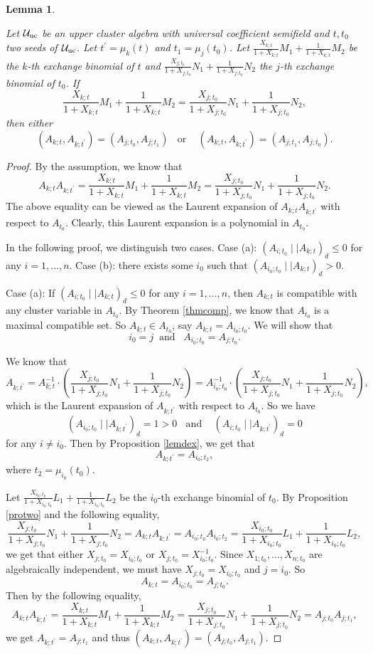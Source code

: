 \documentclass{amsart}
\newtheorem{lemma}[theorem]{Lemma}
\theoremstyle{definition}
\theoremstyle{remark}
\numberwithin{equation}{section}
\begin{document}
\begin{lemma} \label{lemb}

Let $\mathcal U_{\rm uc}$ be an upper cluster algebra with universal coefficient semifield and $t, t_0$ two seeds of  $\mathcal U_{\rm uc}$. Let $t^\prime=\mu_k(t)$ and $t_1=\mu_j(t_0)$. Let $\frac{X_{k;t}}{1+X_{k;t}}M_1+\frac{1}{1+X_{k;t}}M_2$ be the $k$-th exchange binomial of $t$ and $\frac{X_{j;t_0}}{1+X_{j;t_0}}N_1+\frac{1}{1+X_{j;t_0}}N_2$  the $j$-th exchange binomial of $t_0$.
If $$\frac{X_{k;t}}{1+X_{k;t}}M_1+\frac{1}{1+X_{k;t}}M_2=\frac{X_{j;t_0}}{1+X_{j;t_0}}N_1+\frac{1}{1+X_{j;t_0}}N_2,$$
then either $$(A_{k;t},A_{k;t^\prime})=(A_{j;t_0},A_{j;t_1})\;\;\text{ or }\;\;\;(A_{k;t},A_{k;t^\prime})=(A_{j;t_1},A_{j;t_0}).$$
\end{lemma}
\begin{proof}
By the assumption, we know that $$A_{k;t}A_{k;t^\prime}=\frac{X_{k;t}}{1+X_{k;t}}M_1+\frac{1}{1+X_{k;t}}M_2=\frac{X_{j;t_0}}{1+X_{j;t_0}}N_1+\frac{1}{1+X_{j;t_0}}N_2.$$
The above equality can be viewed as the Laurent expansion of $A_{k;t}A_{k;t^\prime}$ with respect to $A_{t_0}$. Clearly, this Laurent expansion is a polynomial in $A_{t_0}$.

In the following proof, we distinguish two cases. Case (a): $(A_{i;t_0}\mid\mid  A_{k;t})_d\leq 0$ for any $i=1,\ldots,n$. Case (b): there exists some $i_0$ such that $(A_{i_0;t_0}\mid\mid  A_{k;t})_d>0$.

Case (a): If $(A_{i;t_0}\mid\mid  A_{k;t})_d\leq 0$ for any $i=1,\ldots,n$, then $A_{k;t}$ is compatible with any cluster variable in $A_{t_0}$. By Theorem \ref{thmcomp}, we know that $A_{t_0}$ is a maximal compatible set. So $A_{k;t}\in A_{t_0}$, say $A_{k;t}=A_{i_0;t_0}$. We will show that $$i_0=j\;\;\text{and}\;\;\;A_{i_0;t_0}=A_{j;t_0}.$$

 We know that
 $$A_{k;t^\prime}=A_{k;t}^{-1}\cdot(\frac{X_{j;t_0}}{1+X_{j;t_0}}N_1+\frac{1}{1+X_{j;t_0}}N_2)
 =A_{i_0;t_0}^{-1}\cdot(\frac{X_{j;t_0}}{1+X_{j;t_0}}N_1+\frac{1}{1+X_{j;t_0}}N_2),$$
 which is the Laurent expansion of $A_{k;t^\prime}$ with respect to $A_{t_0}$. So we have $$(A_{i_0;t_0}\mid\mid  A_{k;t^\prime})_d=1>0\;\;\text{ and }\;\;\;(A_{i;t_0}\mid\mid  A_{k;t^\prime})_d=0$$ for any $i\neq i_0$.
 Then by Proposition \ref{lemdex}, we get that $$A_{k;t^\prime}=A_{i_0;t_2},$$ where $t_2=\mu_{i_0}(t_0)$.

 Let $\frac{X_{i_0;t_0}}{1+X_{i_0;t_0}}L_1+\frac{1}{1+X_{i_0;t_0}}L_2$ be the $i_0$-th exchange binomial of $t_0$. By Proposition \ref{protwo} and the following equality,
 $$\frac{X_{j;t_0}}{1+X_{j;t_0}}N_1+\frac{1}{1+X_{j;t_0}}N_2=A_{k;t}A_{k;t^\prime}=A_{i_0;t_0}A_{i_0;t_2}
=\frac{X_{i_0;t_0}}{1+X_{i_0;t_0}}L_1+\frac{1}{1+X_{i_0;t_0}}L_2,$$
we get that either $X_{j;t_0}=X_{i_0;t_0}$ or $X_{j;t_0}=X_{i_0;t_0}^{-1}$. Since $X_{1;t_0},\ldots,X_{n;t_0}$ are algebraically independent, we must have $X_{j;t_0}=X_{i_0;t_0}$ and $j=i_0$. So $$A_{k;t}=A_{i_0;t_0}=A_{j;t_0}.$$ Then by the following equality,
$$A_{k;t}A_{k;t^\prime}=\frac{X_{k;t}}{1+X_{k;t}}M_1+\frac{1}{1+X_{k;t}}M_2=\frac{X_{j;t_0}}{1+X_{j;t_0}}N_1+\frac{1}{1+X_{j;t_0}}N_2
=A_{j;t_0}A_{j;t_1},$$
we  get $A_{k;t^\prime}=A_{j;t_1}$ and thus $(A_{k;t},A_{k;t^\prime})=(A_{j;t_0},A_{j;t_1})$.



\end{proof}
\end{document}
